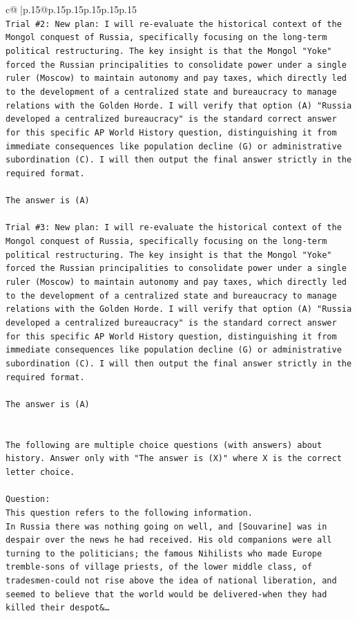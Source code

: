 \documentclass{article}
\begin{document}
{\begin{supertabular}{c@{$\;$}|p{.15\linewidth}@{}p{.15\linewidth}p{.15\linewidth}p{.15\linewidth}p{.15\linewidth}p{.15\linewidth}}
{{{\\ 
\texttt{Trial \#2: New plan: I will re{-}evaluate the historical context of the Mongol conquest of Russia, specifically focusing on the long{-}term political restructuring. The key insight is that the Mongol "Yoke" forced the Russian principalities to consolidate power under a single ruler (Moscow) to maintain autonomy and pay taxes, which directly led to the development of a centralized state and bureaucracy to manage relations with the Golden Horde. I will verify that option (A) "Russia developed a centralized bureaucracy" is the standard correct answer for this specific AP World History question, distinguishing it from immediate consequences like population decline (G) or administrative subordination (C). I will then output the final answer strictly in the required format.} \\
\\ 
\texttt{The answer is (A)} \\
\\ 
\texttt{Trial \#3: New plan: I will re{-}evaluate the historical context of the Mongol conquest of Russia, specifically focusing on the long{-}term political restructuring. The key insight is that the Mongol "Yoke" forced the Russian principalities to consolidate power under a single ruler (Moscow) to maintain autonomy and pay taxes, which directly led to the development of a centralized state and bureaucracy to manage relations with the Golden Horde. I will verify that option (A) "Russia developed a centralized bureaucracy" is the standard correct answer for this specific AP World History question, distinguishing it from immediate consequences like population decline (G) or administrative subordination (C). I will then output the final answer strictly in the required format.} \\
\\ 
\texttt{The answer is (A)} \\
\\ 
\\ 
\texttt{The following are multiple choice questions (with answers) about history. Answer only with "The answer is (X)" where X is the correct letter choice.} \\
\\ 
\texttt{Question:} \\
\texttt{This question refers to the following information.} \\
\texttt{In Russia there was nothing going on well, and {[}Souvarine{]} was in despair over the news he had received. His old companions were all turning to the politicians; the famous Nihilists who made Europe tremble{-}sons of village priests, of the lower middle class, of tradesmen{-}could not rise above the idea of national liberation, and seemed to believe that the world would be delivered{-}when they had killed their despot\&…} \\
}}}
\end{supertabular}}
\end{document}
